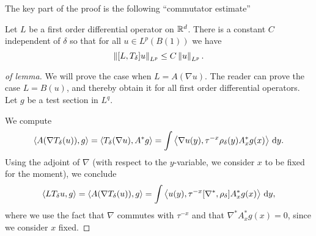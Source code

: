 \documentclass{amsart}
\begin{document}
The key part of the proof is the following ``commutator estimate''
\begin{lemma}
  Let $L$ be a first order differential operator on $\mathbb{R}^{d}$. There is
  a constant $C$ independent of $\delta$ so that for all $u\in L^{p}(B(1))$ we have
  \begin{equation*}
    \left\lVert[L,T_{\delta}]u\right\rVert_{L^{p}}\le C\left\lVert u\right\rVert_{L^{p}}.
  \end{equation*}
\end{lemma}
\begin{proof}[of lemma]
    We will prove the case when $L=A(\nabla u)$. The reader can prove
    the case $L=B(u)$, and thereby obtain it for all first order
    differential operators. Let $g$ be a test section in $L^{q}$.

    We compute
    \begin{equation*}
      \left\langle A(\nabla T_{\delta}(u)),g\right\rangle=\left\langle T_{\delta}(\nabla
        u),A^{*}g\right\rangle=\int \left\langle\nabla u(y), \tau^{-x}\rho_{\delta}(y)A^{*}_{x}g(x)\right\rangle\,\mathrm{d} y.
    \end{equation*}
    Using the adjoint of $\nabla$ (with respect to the $y$-variable,
    we consider $x$ to be fixed for the moment), we conclude
    \begin{equation*}
     \left\langle LT_{\delta}u,g\right\rangle=\left\langle A(\nabla T_{\delta}(u)),g\right\rangle=\int \left\langle u(y), \tau^{-x}[\nabla^{*},\rho_{\delta}]A^{*}_{x}g(x)\right\rangle\,\mathrm{d} y,
   \end{equation*}
   where we use the fact that $\nabla$ commutes with $\tau^{-x}$ and
   that $\nabla^{*}A^{*}_{x}g(x)=0$, since we consider $x$ fixed.


\end{proof}
\end{document}
